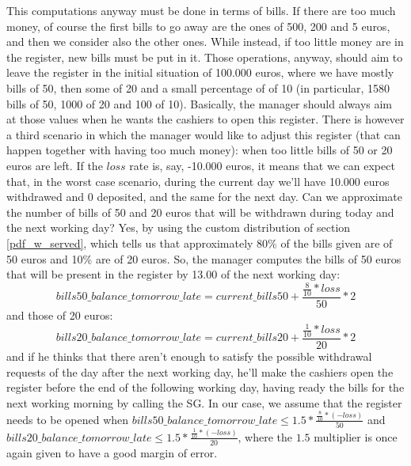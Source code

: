 \documentclass{article}
\begin{document}
This computations anyway must be done in terms of bills. If there are too much money, of course the first bills to go away are the ones of 500, 200 and 5 euros, and then we consider also the other ones. While instead, if too little money are in the register, new bills must be put in it. Those operations, anyway, should aim to leave the register in the initial situation of 100.000 euros, where we have mostly bills of 50, then some of 20 and a small percentage of of 10 (in particular, 1580 bills of 50, 1000 of 20 and 100 of 10). Basically, the manager should always aim at those values when he wants the cashiers to open this register.
\newline There is however a third scenario in which the manager would like to adjust this register (that can happen together with having too much money): when too little bills of 50 or 20 euros are left. If the $loss$ rate is, say, -10.000 euros, it means that we can expect that, in the worst case scenario, during the current day we'll have 10.000 euros withdrawed and 0 deposited, and the same for the next day. Can we approximate the number of bills of 50 and 20 euros that will be withdrawn during today and the next working day? Yes, by using the custom distribution of section \ref{pdf_w_served}, which tells us that approximately 80\% of the bills given are of 50 euros and 10\% are of 20 euros. %
So, the manager computes the bills of 50 euros that will be present in the register by 13.00 of the next working day:
\begin{equation*}
    bills50\_balance\_tomorrow\_late = current\_bills50 + \frac{\frac{8}{10} * loss}{50}*2
\end{equation*}
and those of 20 euros:
\begin{equation*}
    bills20\_balance\_tomorrow\_late = current\_bills20 + \frac{\frac{1}{10} * loss}{20}*2
\end{equation*}
and if he thinks that there aren't enough to satisfy the possible withdrawal requests of the day after the next working day, he'll make the cashiers open the register before the end of the following working day, having ready the bills for the next working morning by calling the SG. In our case, we assume that the register needs to be opened when $bills50\_balance\_tomorrow\_late \leq 1.5*\frac{\frac{8}{10} * (-loss)}{50}$ and $bills20\_balance\_tomorrow\_late \leq 1.5*\frac{\frac{1}{10} * (-loss)}{20}$, where the $1.5$ multiplier is once again given to have a good margin of error.
\end{document}
